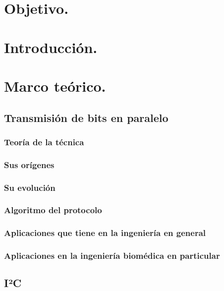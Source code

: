 \documentclass[conference]{IEEEtran}
\begin{document}

\section{Objetivo.}%

\section{Introducción.} %

\section{Marco teórico.} %
\subsection{Transmisión de bits en paralelo}
  \subsubsection{Teoría de la técnica}
  \subsubsection{Sus orígenes}
  \subsubsection{Su evolución}
  \subsubsection{Algoritmo del protocolo}
  \subsubsection{Aplicaciones que tiene en la ingeniería en general}
  \subsubsection{Aplicaciones en la ingeniería biomédica en particular}


  \subsection{I²C}
\end{document}
